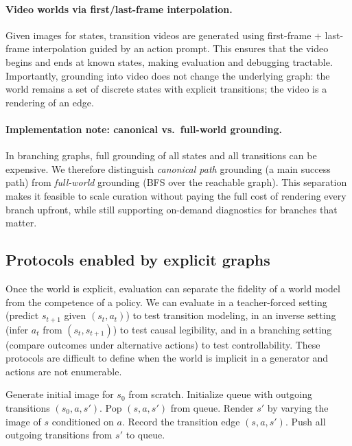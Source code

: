 \documentclass{article}
\theoremstyle{plain}
\theoremstyle{definition}
\theoremstyle{remark}
\begin{document}
\paragraph{Video worlds via first/last-frame interpolation.}
Given images for states, transition videos are generated using first-frame + last-frame interpolation guided by an action prompt. This ensures that the video begins and ends at known states, making evaluation and debugging tractable. Importantly, grounding into video does not change the underlying graph: the world remains a set of discrete states with explicit transitions; the video is a rendering of an edge.

\paragraph{Implementation note: canonical vs.\ full-world grounding.}
In branching graphs, full grounding of all states and all transitions can be expensive. We therefore distinguish \emph{canonical path} grounding (a main success path) from \emph{full-world} grounding (BFS over the reachable graph). This separation makes it feasible to scale curation without paying the full cost of rendering every branch upfront, while still supporting on-demand diagnostics for branches that matter.

\subsection{Protocols enabled by explicit graphs}
Once the world is explicit, evaluation can separate the fidelity of a world model from the competence of a policy. We can evaluate in a teacher-forced setting (predict $s_{t+1}$ given $(s_t,a_t)$) to test transition modeling, in an inverse setting (infer $a_t$ from $(s_t,s_{t+1})$) to test causal legibility, and in a branching setting (compare outcomes under alternative actions) to test controllability. These protocols are difficult to define when the world is implicit in a generator and actions are not enumerable.

\begin{algorithm}[t]
\caption{Full-world image grounding via BFS over an action-conditioned graph.}
\label{alg:bfs_grounding}
\begin{algorithmic}[1]
\STATE Generate initial image for $s_0$ from scratch.
\STATE Initialize queue with outgoing transitions $(s_0,a,s')$.
  \STATE Pop $(s,a,s')$ from queue.
    \STATE Render $s'$ by varying the image of $s$ conditioned on $a$.
  \ENDIF
  \STATE Record the transition edge $(s,a,s')$.
  \STATE Push all outgoing transitions from $s'$ to queue.
\ENDWHILE
\end{algorithmic}
\end{algorithm}
\end{document}
